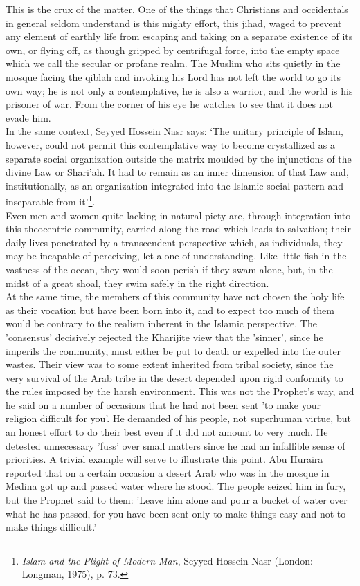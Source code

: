 \documentclass[10pt, twoside]{book}
\begin{document}
This is the crux of the matter. One of the things that Christians and occidentals in general seldom 
understand is this mighty effort, this jihad, waged to prevent any element of earthly life from 
escaping and taking on a separate existence of its own, or flying off, as though gripped by 
centrifugal force, into the empty space which we call the secular or profane realm. The Muslim who 
sits quietly in the mosque facing the qiblah and invoking his Lord has not left the world to go its 
own way; he is not only a contemplative, he is also a warrior, and the world is his prisoner of war. 
From the corner of his eye he watches to see that it does not evade him. \\

In the same context, Seyyed Hossein Nasr says: `The unitary principle of Islam, however, could not 
permit this contemplative way to become crystallized as a separate social organization outside the 
matrix moulded by the injunctions of the divine Law or Shari'ah. It had to remain as an inner 
dimension of that Law and, institutionally, as an organization integrated into the Islamic social 
pattern and inseparable from it'\footnote{\emph{Islam and the Plight of Modern Man}, Seyyed Hossein Nasr (London: Longman, 1975), p. 73.}.\\

Even men and women quite lacking in natural piety are, through integration into this theocentric 
community, carried along the road which leads to salvation; their daily lives penetrated by a 
transcendent perspective which, as individuals, they may be incapable of perceiving, let alone of 
understanding. Like little fish in the vastness of the ocean, they would soon perish if they swam 
alone, but, in the midst of a great shoal, they swim safely in the right direction. \\

At the same time, the members of this community have not chosen the holy life as their vocation but 
have been born into it, and to expect too much of them would be contrary to the realism inherent in 
the Islamic perspective. The 'consensus' decisively rejected the Kharijite view that the 'sinner', 
since he imperils the community, must either be put to death or expelled into the outer wastes. Their 
view was to some extent inherited from tribal society, since the very survival of the Arab tribe in 
the desert depended upon rigid conformity to the rules imposed by the harsh environment. This was not 
the Prophet's way, and he said on a number of occasions that he had not been sent 'to make your 
religion difficult for you'. He demanded of his people, not superhuman virtue, but an honest effort 
to do their best even if it did not amount to very much. He detested unnecessary 'fuss' over small 
matters since he had an infallible sense of priorities. A trivial example will serve to illustrate 
this point. Abu Huraira reported that on a certain occasion a desert Arab who was in the mosque in 
Medina got up and passed water where he stood. The people seized him in fury, but the Prophet said to 
them: 'Leave him alone and pour a bucket of water over what he has passed, for you have been sent 
only to make things easy and not to make things difficult.' \\
\end{document}
